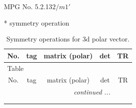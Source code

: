 \documentclass[fleqn,8pt]{jsarticle}
\begin{document}
\setcounter{MaxMatrixCols}{32}

\renewcommand{\tablename}{Table~}
\renewcommand{\figurename}{Figure~}
\begin{center}
\LARGE
MPG No. 5.2.13\quad$2/m1'$
\end{center}
* symmetry operation
\renewcommand{\arraystretch}{1.3}
\begin{longtable}{ccccc}
\caption{Symmetry operations for 3d polar vector.}
 \\
 \hline \hline
No. & tag & matrix (polar) & det & TR \\ \hline \endfirsthead

\multicolumn{4}{l}{\tablename\ \thetable{}} \\
 \hline \hline
No. & tag & matrix (polar) & det & TR \\ \hline \endhead

 \hline \hline
\multicolumn{4}{r}{\footnotesize\it continued ...} \\ \endfoot

 \hline \hline
\multicolumn{4}{r}{} \\ \endlastfoot


\end{longtable}
\end{document}
